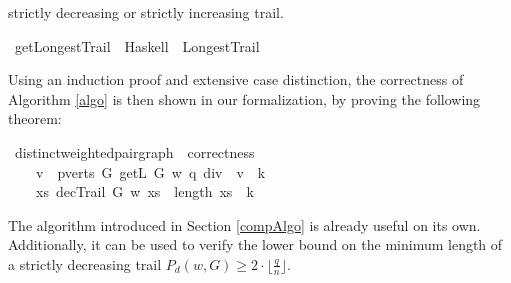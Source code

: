 \begin{isabellebody}
\begin{isamarkuptext}
strictly decreasing or strictly increasing trail.%
\end{isamarkuptext}\isamarkuptrue%
\isamarkupfalse%
\ getLongestTrail\ \ Haskell\ \ LongestTrail\isanewline
%
\isadelimproof
%
\endisadelimproof
%
\isatagproof
%
\endisatagproof
{\isafoldproof}%
%
\isadelimproof
%
\endisadelimproof
%
\isadelimproof
%
\endisadelimproof
%
\isatagproof
%
\endisatagproof
{\isafoldproof}%
%
\isadelimproof
%
\endisadelimproof
%
\isadelimproof
%
\endisadelimproof
%
\isatagproof
%
\endisatagproof
{\isafoldproof}%
%
\isadelimproof
%
\endisadelimproof
%
\isadelimproof
%
\endisadelimproof
%
\isatagproof
%
\endisatagproof
{\isafoldproof}%
%
\isadelimproof
%
\endisadelimproof
%
\begin{isamarkuptext}%
Using an induction proof and extensive case distinction, the correctness of Algorithm \ref{algo} 
is then shown in our formalization, by proving the following theorem:%
\end{isamarkuptext}\isamarkuptrue%
\isamarkupfalse%
{\isacharparenleft}\ distinct{\isacharunderscore}weighted{\isacharunderscore}pair{\isacharunderscore}graph{\isacharparenright}\ \ correctness{\isacharcolon}\isanewline
\ \ \ {\isachardoublequoteopen}{\isasymexists}\ v\ {\isasymin}\ {\isacharparenleft}pverts\ G{\isacharparenright}{\isachardot}\ getL\ G\ w\ {\isacharparenleft}q\ div\ {}{\isacharparenright}\ v\ {\isacharequal}\ k{\isachardoublequoteclose}\isanewline
\ \ \ {\isachardoublequoteopen}{\isasymexists}\ xs{\isachardot}\ decTrail\ G\ w\ xs\ {\isasymand}\ length\ xs\ {\isacharequal}\ k{\isachardoublequoteclose}%
\isadelimproof
%
\endisadelimproof
%
\isatagproof
%
\endisatagproof
{\isafoldproof}%
%
\isadelimproof
%
\endisadelimproof
%
\isadelimdocument
%
\endisadelimdocument
%
\isatagdocument
%
\isamarkuptrue%
%
\endisatagdocument
{\isafolddocument}%
%
\isadelimdocument
%
\endisadelimdocument
%
\isadelimproof
%
\endisadelimproof
%
\isatagproof
%
\endisatagproof
{\isafoldproof}%
%
\isadelimproof
%
\endisadelimproof
%
\begin{isamarkuptext}%
\label{minLength}
The algorithm introduced in Section \ref{compAlgo} is already useful on its own. Additionally, it can be
used to verify the lower bound on the minimum length of a strictly decreasing trail $P_d(w,G) \ge 2 \cdot \lfloor \frac{q}{n} \rfloor$.


\end{isamarkuptext}
\end{isabellebody}
